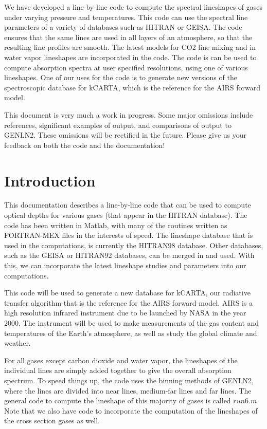\documentclass[11pt]{article}
\begin{document}
  We have developed a line-by-line code to compute the spectral lineshapes
  of gases under varying pressure and temperatures. This code can use the
  spectral line parameters of a variety of databases such as HITRAN or 
  GEISA. 
  The code ensures that the same lines are used in all layers of an
  atmosphere, so that the resulting line profiles are smooth. The latest
  models for CO2 line mixing and in water vapor lineshapes are incorporated
  in the code. The code is can be used to compute absorption spectra
  at user specified resolutions, using one of various lineshapes.
  One of our uses for the code is to generate new versions of the 
  spectroscopic database for kCARTA, which is the reference for the AIRS
  forward model.

This document is very much a work in progress.  Some major omissions
include references, significant examples of output, and comparisons of 
output to GENLN2.  These omissions will
be rectified in the future.  Please give us your feedback on both the
code and the documentation!  


\newpage
\section{Introduction}
This documentation describes a line-by-line code that can be used to 
compute optical depths for various gases (that appear in the HITRAN 
database). The code has been written in Matlab, with many of the routines 
written as FORTRAN-MEX files in the interests of speed. The lineshape 
database that is used in the computations, is currently the HITRAN98 
database. Other databases, such as the GEISA or HITRAN92 databases, can be 
merged in and used. With this, we can incorporate the latest lineshape 
studies and parameters into our computations. 

This code will be used to generate a new database for kCARTA, our radiative
transfer algorithm that is the reference for the AIRS forward model. AIRS is
a high resolution infrared instrument due to be launched by NASA in the 
year 2000. The instrument will be used to make measurements of the gas 
content and temperatures of the Earth's atmosphere, as well as study the 
global climate and weather. 

For all gases except carbon dioxide and water vapor, the lineshapes of the
individual lines are simply added together to give the overall absorption
spectrum. To speed things up, the code uses the binning methods of GENLN2, 
where the lines are divided into near lines, medium-far lines and far 
lines. The general code to compute the lineshape of this majority of gases 
is called $run6.m$ Note that we also have code to incorporate the 
computation of the lineshapes of the cross section gases as well.
\end{document}

